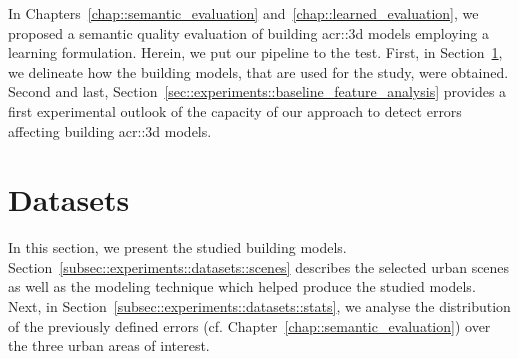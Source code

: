 \minitoc

\vfill

In Chapters~\ref{chap::semantic_evaluation} and~\ref{chap::learned_evaluation}, we proposed a semantic quality evaluation of building \gls{acr::3d} models employing a learning formulation.
Herein, we put our pipeline to the test.
First, in Section~\ref{sec::experiments::datasets}, we delineate how the building models, that are used for the study, were obtained.
Second and last, Section~\ref{sec::experiments::baseline_feature_analysis} provides a first experimental outlook of the capacity of our approach to detect errors affecting building \gls{acr::3d} models.

\clearpage

\section{Datasets}
    \label{sec::experiments::datasets}
    In this section, we present the studied building models.
    Section~\ref{subsec::experiments::datasets::scenes} describes the selected urban scenes as well as the modeling technique which helped produce the studied models.
    Next, in Section~\ref{subsec::experiments::datasets::stats}, we analyse the distribution of the previously defined errors (cf. Chapter~\ref{chap::semantic_evaluation}) over the three urban areas of interest.
    

